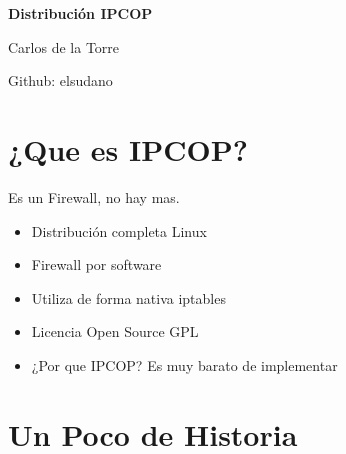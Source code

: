 \documentclass[
paper=128mm:96mm, %
fontsize=11pt, %
pagesize, %
parskip=half-, %
]{scrartcl} %
\newcommand*{\mytitle}{Distribución IPCOP} %
\newcommand*{\myauthor}{Carlos de la Torre} %
\newcommand{\github}{Github: elsudano} %
\begin{document}

\thispagestyle{empty} %
\begin{flushright}
\vspace{0.6cm}
\color{white}\sffamily
{\bfseries\Large\mytitle\par} %
\vspace{0.5cm}
\normalsize
\myauthor\par %
\github\par %
\vfill
\end{flushright}
\setcounter{page}{0}
\clearpage

\section{¿Que es IPCOP\cite{ipcop}?}
Es un Firewall, no hay mas.
\begin{itemize}
	\item Distribución completa Linux
	\item Firewall por software
	\item Utiliza de forma nativa iptables
	\item Licencia Open Source GPL
	\item ¿Por que IPCOP? Es muy barato de implementar
\end{itemize}
\clearpage

\section{Un Poco de Historia \cite{historia1}}
\end{document}
